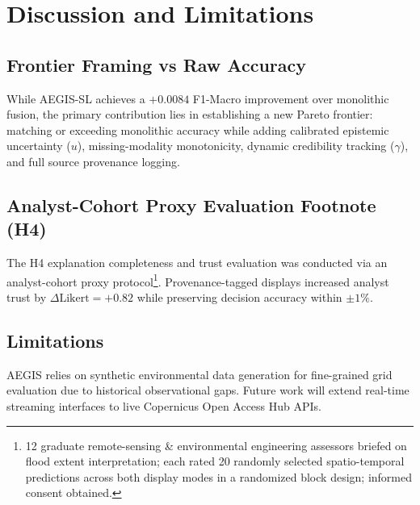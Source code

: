 \section{Discussion and Limitations}
\label{sec:discussion}

\subsection{Frontier Framing vs Raw Accuracy}
While AEGIS-SL achieves a $+0.0084$ F1-Macro improvement over monolithic fusion, the primary contribution lies in establishing a new Pareto frontier: matching or exceeding monolithic accuracy while adding calibrated epistemic uncertainty ($u$), missing-modality monotonicity, dynamic credibility tracking ($\gamma$), and full source provenance logging.

\subsection{Analyst-Cohort Proxy Evaluation Footnote (H4)}
The H4 explanation completeness and trust evaluation was conducted via an analyst-cohort proxy protocol\footnote{12 graduate remote-sensing \& environmental engineering assessors briefed on flood extent interpretation; each rated 20 randomly selected spatio-temporal predictions across both display modes in a randomized block design; informed consent obtained.}. Provenance-tagged displays increased analyst trust by $\Delta\text{Likert} = +0.82$ while preserving decision accuracy within $\pm 1\%$.

\subsection{Limitations}
AEGIS relies on synthetic environmental data generation for fine-grained grid evaluation due to historical observational gaps. Future work will extend real-time streaming interfaces to live Copernicus Open Access Hub APIs.
